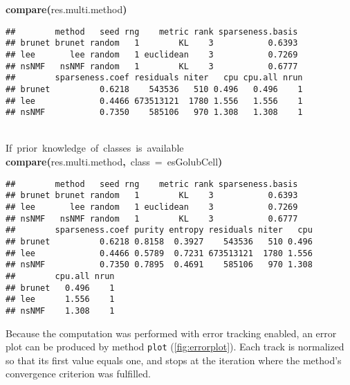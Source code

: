 \documentclass[a4paper]{article}\usepackage{graphicx, color}
\makeatletter
\newcommand{\hlfunctioncall}[1]{\textcolor[rgb]{0.501960784313725,0,0.329411764705882}{\textbf{#1}}}%
\newcommand{\hlkeyword}[1]{\textcolor[rgb]{0,0,0}{\textbf{#1}}}%
\newcommand{\hlargument}[1]{\textcolor[rgb]{0.690196078431373,0.250980392156863,0.0196078431372549}{#1}}%
\newcommand{\hlcomment}[1]{\textcolor[rgb]{0.180392156862745,0.6,0.341176470588235}{#1}}%
\newcommand{\hlsymbol}[1]{\textcolor[rgb]{0,0,0}{#1}}%
\newcommand{\hlstd}[1]{\textcolor[rgb]{0,0,0}{#1}}%
\newenvironment{kframe}{%
 \def\FrameCommand##1{\hskip\@totalleftmargin \hskip-\fboxsep
 \colorbox{shadecolor}{##1}\hskip-\fboxsep
     \hskip-\linewidth \hskip-\@totalleftmargin \hskip\columnwidth}%
 \MakeFramed {\advance\hsize-\width
   \@totalleftmargin\z@ \linewidth\hsize
   \@setminipage}}%
 {\par\unskip\endMakeFramed}
\newenvironment{knitrout}{}{} %
\let\code=\texttt
\makeatother
\begin{document}
\begin{knitrout}
\color{fgcolor}\begin{kframe}
\begin{flushleft}
\ttfamily\noindent
\hlfunctioncall{compare}\hlkeyword{(}\hlsymbol{res.multi.method}\hlkeyword{)}\mbox{}
\normalfont
\end{flushleft}
\begin{verbatim}
##        method   seed rng    metric rank sparseness.basis
## brunet brunet random   1        KL    3           0.6393
## lee       lee random   1 euclidean    3           0.7269
## nsNMF   nsNMF random   1        KL    3           0.6777
##        sparseness.coef residuals niter   cpu cpu.all nrun
## brunet          0.6218    543536   510 0.496   0.496    1
## lee             0.4466 673513121  1780 1.556   1.556    1
## nsNMF           0.7350    585106   970 1.308   1.308    1
\end{verbatim}
\begin{flushleft}
\ttfamily\noindent
\hspace*{\fill}\\
\hlstd{}\hlcomment{\usebox{\hlnormalsizeboxhash}{\ }If{\ }prior{\ }knowledge{\ }of{\ }classes{\ }is{\ }available}\hspace*{\fill}\\
\hlstd{}\hlfunctioncall{compare}\hlkeyword{(}\hlsymbol{res.multi.method}\hlkeyword{,}{\ }\hlargument{class}{\ }\hlargument{=}{\ }\hlsymbol{esGolub}\hlkeyword{\usebox{\hlnormalsizeboxdollar}}\hlsymbol{Cell}\hlkeyword{)}\mbox{}
\normalfont
\end{flushleft}
\begin{verbatim}
##        method   seed rng    metric rank sparseness.basis
## brunet brunet random   1        KL    3           0.6393
## lee       lee random   1 euclidean    3           0.7269
## nsNMF   nsNMF random   1        KL    3           0.6777
##        sparseness.coef purity entropy residuals niter   cpu
## brunet          0.6218 0.8158  0.3927    543536   510 0.496
## lee             0.4466 0.5789  0.7231 673513121  1780 1.556
## nsNMF           0.7350 0.7895  0.4691    585106   970 1.308
##        cpu.all nrun
## brunet   0.496    1
## lee      1.556    1
## nsNMF    1.308    1
\end{verbatim}
\end{kframe}
\end{knitrout}


Because the computation was performed with error tracking enabled, an error plot
can be produced by method \code{plot} (\cref{fig:errorplot}).
Each track is normalized so that its first value equals one, and stops at the iteration where the method's convergence criterion was fulfilled.
\end{document}
